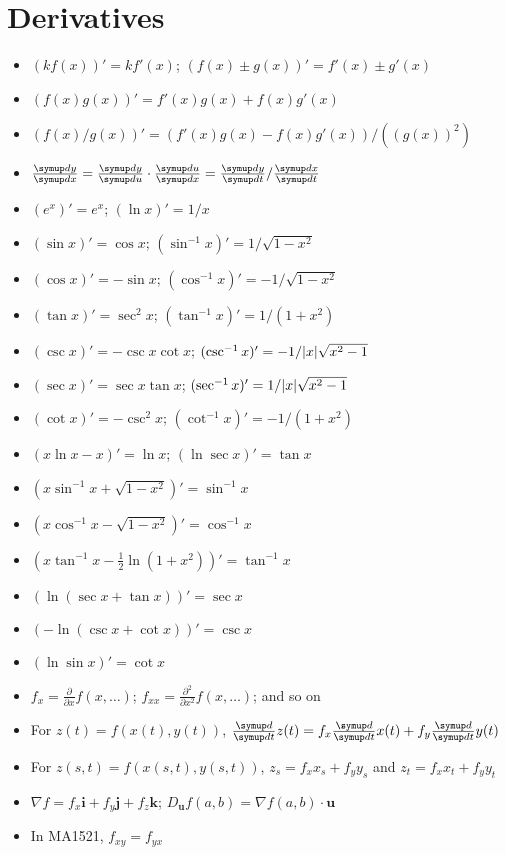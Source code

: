 \documentclass{slnotes}
\DeclarePairedDelimiter\abs{\lvert}{\rvert}%
\begin{document}
\section{Derivatives}
\begin{itemize}
\item \((kf(x))' = kf'(x)\); \((f(x) \pm g(x))' = f'(x) \pm g'(x)\)
\item \((f(x)g(x))' = f'(x)g(x) + f(x)g'(x)\)
\item \((f(x)/g(x))' = (f'(x)g(x)-f(x)g'(x))/((g(x))^2)\)
\item \(\sldd{y}{x} = \sldd{y}{u} \cdot \sldd{u}{x} = \sldd{y}{t}/\sldd{x}{t}\)
\item \((e^x)' = e^x\); \((\ln x)' = 1/x\)
\item \((\sin x)' = \cos x\); \((\sin^{-1} x)' = 1/\sqrt{1-x^2}\)
\item \((\cos x)' = -\sin x\); \((\cos^{-1} x)' = -1/\sqrt{1-x^2}\)
\item \((\tan x)' = \sec^2 x\); \((\tan^{-1} x)' = 1/(1+x^2)\)
\item \((\csc x)' = -\csc x \cot x\); \((\csc^{-1} x)' = -1/\abs{x}\sqrt{x^2-1}\)
\item \((\sec x)' = \sec x \tan x\); \((\sec^{-1} x)' = 1/\abs{x}\sqrt{x^2-1}\)
\item \((\cot x)' = -\csc^2 x\); \((\cot^{-1} x)' = -1/(1+x^2)\)
\item \((x\ln x - x)' = \ln x\); \((\ln\sec x)' = \tan x\)
\item \((x\sin^{-1}x + \sqrt{1-x^2})' = \sin^{-1}x\)
\item \((x\cos^{-1}x - \sqrt{1-x^2})' = \cos^{-1}x\)
\item \((x\tan^{-1}x-\frac{1}{2}\ln(1+x^2))' = \tan^{-1}x\)
\item \((\ln(\sec x + \tan x))' = \sec x\)
\item \((-\ln(\csc x + \cot x))' = \csc x\)
\item \((\ln\sin x)' = \cot x\)
\item \(f_x = \frac{\partial}{\partial x} f(x, \hdots)\); \(f_{xx} = \frac{\partial^2}{\partial x^2} f(x, \hdots)\); and so on
\item For \(z(t) = f(x(t), y(t))\), \(\sldd{}{t} z(t) = f_x \sldd{}{t} x(t) + f_y \sldd{}{t} y(t)\)
\item For \(z(s, t) = f(x(s, t), y(s, t))\), \(z_s = f_xx_s + f_yy_s\) and \(z_t = f_xx_t + f_yy_t\)
\item \(\nabla f = f_x\mathbf{i} + f_y\mathbf{j} + f_z\mathbf{k}\); \(D_{\mathbf{u}}f(a, b) = \nabla f(a, b)\cdot\mathbf{u}\)
\item In MA1521, \(f_{xy} = f_{yx}\)
\end{itemize}
\end{document}
